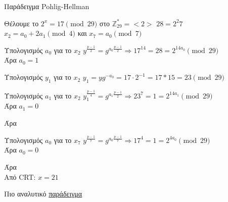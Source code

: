 \documentclass[handout]{beamer}
\begin{document}
\begin{frame}[allowframebreaks]{Παράδειγμα Pohlig-Hellman}
\begin{block}{Θέλουμε το $2^x = 17 \pmod{29}$ στο $\mathbb{Z}_{29}^*=<2>$}
$28=2^2 7$ \\
$x_2 = a_0 + 2a_1 \pmod{4}$ και $x_7 = a_0 \pmod{7}$ \\
\end{block}

\begin{block}{Υπολογισμός $a_0$ για το $x_2$}
$y^\frac{p-1}{2} = g^{a_0 \frac{p-1}{2}} \Rightarrow 17^{14} = 28 = 2^{14 a_0} \pmod{29}$ \\
Άρα $a_0=1$
\end{block}

\begin{block}{Υπολογισμός $y_1$ για το $x_2$}
$y_1 = y g^{-a_0} = 17 \cdot 2^{-1} = 17 * 15 = 23 \pmod{29} $
\end{block}

\framebreak

\begin{block}{Υπολογισμός $a_1$ για το $x_2$}
$y_1^\frac{p-1}{4} = g^{a_1 \frac{p-1}{2}} \Rightarrow 23^7 = 1 = 2^{14 a_1} \pmod{29}$\\
Άρα $a_1=0$ \\
\end{block}
Άρα 
 
\begin{block}{Υπολογισμός $a_0$ για το $x_7$}
$y^\frac{p-1}{7} = g^{a_0 \frac{p-1}{7}} \Rightarrow 17^4 = 1 = 2^{4 a_0} \pmod{29}$ \\
Άρα $a_0=0$
\end{block}

Άρα 
\\
Από CRT: $x = 21$

Πιο αναλυτικό  \href{http://www-math.ucdenver.edu/~wcherowi/courses/m5410/phexam.html}{παράδειγμα}
\end{frame}
\end{document}

